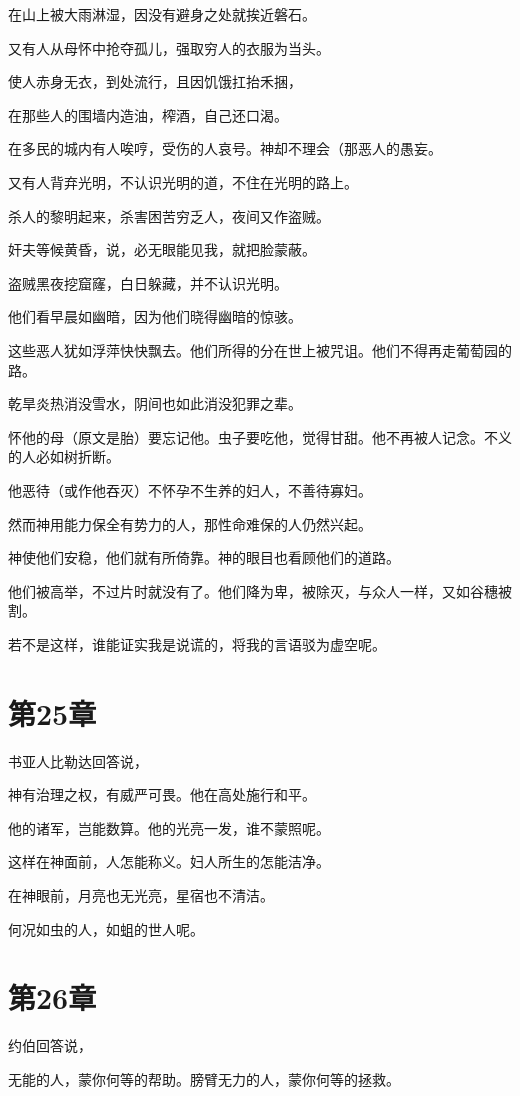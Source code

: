 \documentclass[12pt,oneside]{book}
\begin{document}
在山上被大雨淋湿，因没有避身之处就挨近磐石。

又有人从母怀中抢夺孤儿，强取穷人的衣服为当头。

使人赤身无衣，到处流行，且因饥饿扛抬禾捆，

在那些人的围墙内造油，榨酒，自己还口渴。

在多民的城内有人唉哼，受伤的人哀号。神却不理会（那恶人的愚妄。

又有人背弃光明，不认识光明的道，不住在光明的路上。

杀人的黎明起来，杀害困苦穷乏人，夜间又作盗贼。

奸夫等候黄昏，说，必无眼能见我，就把脸蒙蔽。

盗贼黑夜挖窟窿，白日躲藏，并不认识光明。

他们看早晨如幽暗，因为他们晓得幽暗的惊骇。

这些恶人犹如浮萍快快飘去。他们所得的分在世上被咒诅。他们不得再走葡萄园的路。

乾旱炎热消没雪水，阴间也如此消没犯罪之辈。

怀他的母（原文是胎）要忘记他。虫子要吃他，觉得甘甜。他不再被人记念。不义的人必如树折断。

他恶待（或作他吞灭）不怀孕不生养的妇人，不善待寡妇。

然而神用能力保全有势力的人，那性命难保的人仍然兴起。

神使他们安稳，他们就有所倚靠。神的眼目也看顾他们的道路。

他们被高举，不过片时就没有了。他们降为卑，被除灭，与众人一样，又如谷穗被割。

若不是这样，谁能证实我是说谎的，将我的言语驳为虚空呢。


\chapter{第25章}
书亚人比勒达回答说，

神有治理之权，有威严可畏。他在高处施行和平。

他的诸军，岂能数算。他的光亮一发，谁不蒙照呢。

这样在神面前，人怎能称义。妇人所生的怎能洁净。

在神眼前，月亮也无光亮，星宿也不清洁。

何况如虫的人，如蛆的世人呢。


\chapter{第26章}
约伯回答说，

无能的人，蒙你何等的帮助。膀臂无力的人，蒙你何等的拯救。
\end{document}
